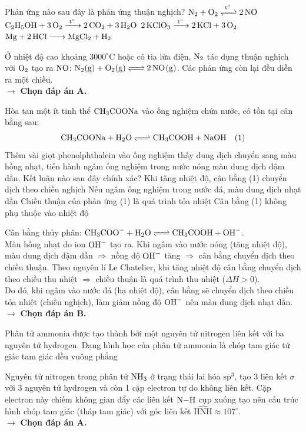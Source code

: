 \documentclass[11pt,a4paper]{article}
\begin{document}
\begin{ex}%
Phản ứng nào sau đây là phản ứng thuận nghịch?
\choice
{\True $\ce{N2 + O2 <=>[t^\circ] 2NO}$}
{$\ce{C2H5OH + 3O2 ->[t^\circ] 2CO2 + 3H2O}$}
{$\ce{2KClO3 ->[t^\circ] 2KCl + 3O2}$}
{$\ce{Mg + 2HCl -> MgCl2 + H2}$}
\begin{loigiai}
Ở nhiệt độ cao khoảng $3000^\circ\text{C}$ hoặc có tia lửa điện, $\ce{N2}$ tác dụng thuận nghịch với $\ce{O2}$ tạo ra $\ce{NO}$: $\ce{N2(g) + O2(g) <=> 2NO(g)}$. Các phản ứng còn lại đều diễn ra một chiều.\\
$\rightarrow$ \textbf{Chọn đáp án A.}
\end{loigiai}
\end{ex}


\begin{ex}%
Hòa tan một ít tinh thể $\ce{CH3COONa}$ vào ống nghiệm chứa nước, có tồn tại cân bằng sau:
$$\ce{CH3COONa + H2O <=> CH3COOH + NaOH}\quad (1)$$
Thêm vài giọt phenolphthalein vào ống nghiệm thấy dung dịch chuyển sang màu hồng nhạt, tiến hành ngâm ống nghiệm trong nước nóng màu dung dịch đậm dần. Kết luận nào sau đây chính xác?
\choice
{Khi tăng nhiệt độ, cân bằng (1) chuyển dịch theo chiều nghịch}
{\True Nếu ngâm ống nghiệm trong nước đá, màu dung dịch nhạt dần}
{Chiều thuận của phản ứng (1) là quá trình tỏa nhiệt}
{Cân bằng (1) không phụ thuộc vào nhiệt độ}
\begin{loigiai}
Cân bằng thủy phân: $\ce{CH3COO- + H2O <=> CH3COOH + OH-}$.\\
Màu hồng nhạt do ion $\ce{OH-}$ tạo ra. Khi ngâm vào nước nóng (tăng nhiệt độ), màu dung dịch đậm dần $\Rightarrow$ nồng độ $\ce{OH-}$ tăng $\Rightarrow$ cân bằng chuyển dịch theo chiều thuận. Theo nguyên lí Le Chatelier, khi tăng nhiệt độ cân bằng chuyển dịch theo chiều thu nhiệt $\Rightarrow$ chiều thuận là quá trình thu nhiệt ($\Delta H > 0$).\\
Do đó, khi ngâm vào nước đá (hạ nhiệt độ), cân bằng sẽ chuyển dịch theo chiều tỏa nhiệt (chiều nghịch), làm giảm nồng độ $\ce{OH-}$ nên màu dung dịch nhạt dần.\\
$\rightarrow$ \textbf{Chọn đáp án B.}
\end{loigiai}
\end{ex}


\begin{ex}%
Phân tử ammonia được tạo thành bởi một nguyên tử nitrogen liên kết với ba nguyên tử hydrogen. Dạng hình học của phân tử ammonia là
\choice
{\True chóp tam giác}
{tứ giác}
{tam giác đều}
{vuông phẳng}
\begin{loigiai}
Nguyên tử nitrogen trong phân tử $\ce{NH3}$ ở trạng thái lai hóa $\text{sp}^3$, tạo 3 liên kết $\sigma$ với 3 nguyên tử hydrogen và còn 1 cặp electron tự do không liên kết. Cặp electron này chiếm không gian đẩy các liên kết $\ce{N-H}$ cụp xuống tạo nên cấu trúc hình chóp tam giác (tháp tam giác) với góc liên kết $\widehat{\text{HNH}} \approx 107^\circ$.\\
$\rightarrow$ \textbf{Chọn đáp án A.}
\end{loigiai}
\end{ex}
\end{document}
